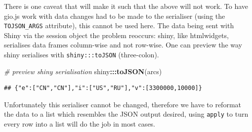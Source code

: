 \documentclass[
]{krantz}
\makeatletter
\newenvironment{Shaded}{\begin{snugshade}}{\end{snugshade}}
\newcommand{\CommentTok}[1]{\textcolor[rgb]{0.37,0.37,0.37}{\textit{#1}}}
\newcommand{\ControlFlowTok}[1]{\textcolor[rgb]{0.27,0.27,0.27}{\textbf{#1}}}
\newcommand{\DataTypeTok}[1]{\textcolor[rgb]{0.27,0.27,0.27}{#1}}
\newcommand{\DecValTok}[1]{\textcolor[rgb]{0.06,0.06,0.06}{#1}}
\newcommand{\KeywordTok}[1]{\textcolor[rgb]{0.27,0.27,0.27}{\textbf{#1}}}
\newcommand{\NormalTok}[1]{#1}
\newcommand{\OperatorTok}[1]{\textcolor[rgb]{0.43,0.43,0.43}{\textbf{#1}}}
\newcommand{\StringTok}[1]{\textcolor[rgb]{0.5,0.5,0.5}{#1}}
\newenvironment{kframe}{%
\medskip{}
\setlength{\fboxsep}{.8em}
 \def\at@end@of@kframe{}%
 \ifinner\ifhmode%
  \def\at@end@of@kframe{\end{minipage}}%
  \begin{minipage}{\columnwidth}%
 \fi\fi%
 \def\FrameCommand##1{\hskip\@totalleftmargin \hskip-\fboxsep
 \colorbox{shadecolor}{##1}\hskip-\fboxsep
     \hskip-\linewidth \hskip-\@totalleftmargin \hskip\columnwidth}%
 \MakeFramed {\advance\hsize-\width
   \@totalleftmargin\z@ \linewidth\hsize
   \@setminipage}}%
 {\par\unskip\endMakeFramed%
 \at@end@of@kframe}
\renewenvironment{Shaded}{\begin{kframe}}{\end{kframe}}
\makeatother
\begin{document}
There is one caveat that will make it such that the above will not work. To have gio.js work with data changes had to be made to the serialiser (using the \texttt{TOJSON\_ARGS} attribute), this cannot be used here. The data being sent with Shiny via the session object the problem reoccurs: shiny, like htmlwidgets, serialises data frames column-wise and not row-wise. One can preview the way shiny serialises with \texttt{shiny:::toJSON} (three-colon).

\begin{Shaded}
\begin{Highlighting}[]
\CommentTok{\# preview shiny serialisation}
\NormalTok{shiny}\OperatorTok{:::}\KeywordTok{toJSON}\NormalTok{(arcs)}
\end{Highlighting}
\end{Shaded}

\begin{verbatim}
## {"e":["CN","CN"],"i":["US","RU"],"v":[3300000,10000]}
\end{verbatim}

Unfortunately this serialiser cannot be changed, therefore we have to reformat the data to a list which resembles the JSON output desired, using \texttt{apply} to turn every row into a list will do the job in most cases.

\begin{Shaded}
\end{Shaded}
\end{document}
